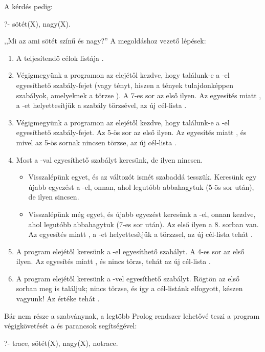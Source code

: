 A kérdés pedig:
\begin{query}
?- sötét(X), nagy(X).
\end{query}
,,Mi az ami sötét színű és nagy?''
A megoldáshoz vezető lépések:
\begin{enumerate}
\item A teljesítendő célok listája .
\item Végigmegyünk a programon az elejétől kezdve,
  hogy talá\-lunk-e a -el egyesíthető
  szabály-fejet (vagy tényt, hiszen a tények
  tulajdonképpen szabályok, amelyeknek a törzse
  ). A 7-es sor az első ilyen. Az egyesítés
  miatt , a -et
  helyettesítjük a szabály törzsével, az új
  cél-lista .
\item Végigmegyünk a programon az elejétől kezdve,
  hogy talá\-lunk-e a -el egyesíthető
  szabály-fejet. Az 5-ös sor az első ilyen. Az
  egyesítés miatt , és mivel az 5-ös
  sornak nincsen törzse, az új cél-lista
  .
\item Most a -val egyesíthető szabályt keresünk, de ilyen nincsen.
  \begin{itemize}
    \item Visszalépünk egyet, és az  változót
      ismét szabaddá tesszük. Keresünk egy újabb
      egyezést a -el, onnan, ahol
      legutóbb abbahagytuk (5-ös sor után), de ilyen
      sincsen.
    \item Visszalépünk még egyet, és újabb egyezést
      keresünk a -el, onnan kezdve,
      ahol legutóbb abbahagytuk (7-es sor után). Az
      első ilyen a 8. sorban van. Az egyesítés miatt
      , a -et helyettesítjük
      a törzzsel, az új cél-lista tehát
      .
  \end{itemize}
\item A program elejétől keresünk a -el
  egyesíthető szabályt. A 4-es sor az első ilyen. Az
  egyesítés miatt , és nincs törzs,
  tehát az új cél-lista .
\item A program elejétől keresünk a
  -vel egyesíthető szabályt. Rögtön
  az első sorban meg is találjuk; nincs törzse, és
  így a cél-listánk elfogyott, készen vagyunk! Az
   értéke tehát .
\end{enumerate}

Bár nem része a szabványnak, a legtöbb Prolog
rendszer lehetővé teszi a program végigkövetését a
 és  parancsok segítségével:
\begin{query}
?- trace, sötét(X), nagy(X), notrace.
\end{query}

